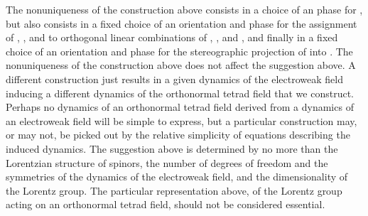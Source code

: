 \documentclass[a4paper,twocolumn,showpacs,preprintnumbers,aps]{revtex4}
\begin{document}
The nonuniqueness of the construction above consists in a choice of an \coordHE{} phase
for \myHighlight{$\Phi$}\coordHE{}, but also consists in a fixed choice of an \coordHE{} orientation and phase for the
assignment of \coordHE{}, \coordHE{}, and \coordHE{} to orthogonal linear
combinations of
\coordHE{},
\coordHE{}, and
\coordHE{},
and finally in a fixed choice of an \coordHE{} orientation and phase for the stereographic
projection of \myHighlight{$\xi$}\coordHE{} into \coordHE{}.
The nonuniqueness of the construction above does not affect the suggestion
above. A different construction just results in a given dynamics of the electroweak field
inducing a different dynamics of the orthonormal tetrad field that we construct.
Perhaps no dynamics of an orthonormal tetrad field derived from a dynamics of an
electroweak field will be simple to express, but a particular construction may, or may not,
be picked out by the relative simplicity of equations describing the induced dynamics.
The suggestion above is determined by no more than the Lorentzian structure of
spinors, the number of degrees of freedom and the symmetries of the dynamics
of the electroweak field, and the dimensionality of the Lorentz group. The particular
representation above, of the Lorentz group acting on an orthonormal tetrad field,
should not be considered essential.
\end{document}
